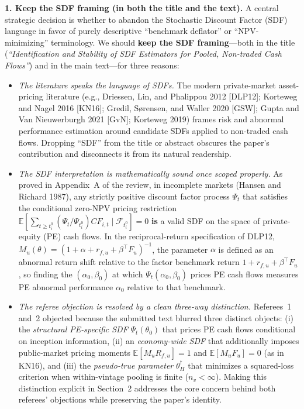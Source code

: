 \documentclass[11pt]{article}
\newcommand{\E}{\mathbb{E}}
\newcommand{\F}{\mathcal{F}}
\begin{document}
\textbf{1. Keep the SDF framing (in both the title and the text).}
A central strategic decision is whether to abandon the Stochastic Discount Factor (SDF) language in favor of purely descriptive ``benchmark deflator'' or ``NPV-minimizing'' terminology. We should \textbf{keep the SDF framing}—both in the title (\emph{``Identification and Stability of SDF Estimators for Pooled, Non-traded Cash Flows''}) and in the main text—for three reasons:
\begin{itemize}
\item \emph{The literature speaks the language of SDFs.} The modern private-market asset-pricing literature (e.g., Driessen, Lin, and Phalippou 2012 [DLP12]; Korteweg and Nagel 2016 [KN16]; Gredil, S{\o}rensen, and Waller 2020 [GSW]; Gupta and Van Nieuwerburgh 2021 [GvN]; Korteweg 2019) frames risk and abnormal performance estimation around candidate SDFs applied to non-traded cash flows. Dropping ``SDF'' from the title or abstract obscures the paper's contribution and disconnects it from its natural readership.
\item \emph{The SDF interpretation is mathematically sound once scoped properly.} As proved in Appendix~A of the review, in incomplete markets (Hansen and Richard 1987), any strictly positive discount factor process $\Psi_t$ that satisfies the conditional zero-NPV pricing restriction $\E[\sum_{t\ge t_i^0}(\Psi_t/\Psi_{t_i^0})CF_{i,t}\mid\F_{t_i^0}]=0$ \textbf{is} a valid SDF on the space of private-equity (PE) cash flows. In the reciprocal-return specification of DLP12, $M_u(\theta)=(1+\alpha+r_{f,u}+\beta^\top F_u)^{-1}$, the parameter $\alpha$ is defined as an abnormal return shift relative to the factor benchmark return $1+r_{f,u}+\beta^\top F_u$, so finding the $(\alpha_0,\beta_0)$ at which $\Psi_t(\alpha_0,\beta_0)$ prices PE cash flows measures PE abnormal performance $\alpha_0$ relative to that benchmark.
\item \emph{The referee objection is resolved by a clean three-way distinction.} Referees~1 and~2 objected because the submitted text blurred three distinct objects: (i) the \emph{structural PE-specific SDF} $\Psi_t(\theta_0)$ that prices PE cash flows conditional on inception information, (ii) an \emph{economy-wide SDF} that additionally imposes public-market pricing moments $\E[M_u R_{f,u}]=1$ and $\E[M_u F_u]=0$ (as in KN16), and (iii) the \emph{pseudo-true parameter} $\theta_H^\dagger$ that minimizes a squared-loss criterion when within-vintage pooling is finite ($n_v<\infty$). Making this distinction explicit in Section~2 addresses the core concern behind both referees' objections while preserving the paper's identity.
\end{itemize}
\end{document}
